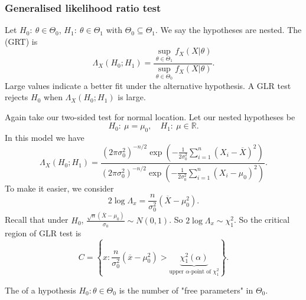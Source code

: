 \documentclass[egregdoesnotlikesansseriftitles,a4paper]{scrartcl}
\begin{document}
\subsubsection*{Generalised likelihood ratio test}
Let $H_0 : \ \theta \in \Theta_0 $, $H_1 : \ \theta \in \Theta_1 $ with $\Theta_0 \subseteq \Theta_1 $. We say the hypotheses are nested. The  (GRT) is \[
\Lambda_{X}(H_0 ; H_1 )= \frac{\sup_{\theta \in \Theta_1 }f_{X}(X| \theta)}{\sup_{\theta \in \Theta_0 }f_{X}(X| \theta)}
.\] Large values indicate a better fit under the alternative hypothesis. A GLR test rejects $H_0 $ when $\Lambda_{X}(H_0 ; H_1 )$ is large.
\begin{example*}
       Again take our two-sided test for normal location. Let our nested hypotheses be \[
       H_0 :\ \mu=\mu_0 , \quad H_1 : \ \mu \in \mathbb{R}
       .\] In this model we have \[
            \Lambda_{X}(H_0 ; H_1 )= \frac{(2\pi \sigma_0 ^2)^{-n/2}\exp(- \frac{1}{2 \sigma_0 ^2}\sum_{i=1}^{n}(X_i-\overline{X})^2)}{(2\pi \sigma_0 ^2)^{-n/2}\exp(- \frac{1}{2 \sigma_0 ^2}\sum_{i=1}^{n}(X_i-\mu_0 )^2)}
       .\] To make it easier, we consider \[
       2 \log \Lambda_{x}=\frac{n}{\sigma_0 ^2}(\overline{X}-\mu_0 ^2)
       .\] Recall that under $H_0 $, $ \frac{\sqrt{n} (\overline{X}-\mu_0 )}{\sigma_0 }\sim N (0,1)$. So $2 \log \Lambda_{x} \sim \chi^2_1$. So the critical region of GLR test is \[
       C=\left\{x: \frac{n}{\sigma_0 ^2}(\overline{x}-\mu_0 ^2)>\underbrace{\chi_1 ^2 (\alpha)}_{\text{upper } \alpha \text{-point of } \chi^2_1 } \right\}
       .\]
\end{example*}
\begin{theorem}
      The  of a hypothesis $H_0 : \theta \in \Theta_0 $ is the number of "free parameters" in $\Theta_0 $.
\end{theorem}
\end{document}
